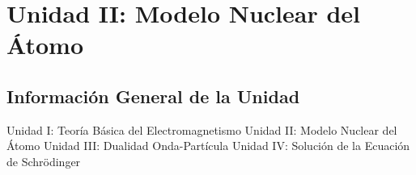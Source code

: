 \documentclass[12pt,a4paper]{book}
\begin{document}
\chapter{Unidad II: Modelo Nuclear del Átomo}

\section{Información General de la Unidad}

Unidad I: Teoría Básica del Electromagnetismo
Unidad II: Modelo Nuclear del Átomo
Unidad III: Dualidad Onda-Partícula
Unidad IV: Solución de la Ecuación de Schrödinger
\end{document}
